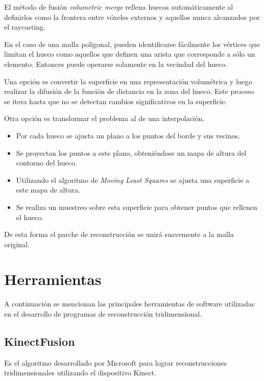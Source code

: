 		El método de fusión \emph{volumetric merge} rellena huecos
		automáticamente al definirlos como la frontera entre vóxeles externos y
		aquellos nunca alcanzados por el raycasting.

		En el caso de una malla poligonal,
		pueden identificarse fácilmente los vértices que limitan el hueco
		como aquellos que definen una arista que corresponde a sólo un elemento.
		Entonces puede operarse solamente en la vecindad del hueco.

		Una opción es convertir la superficie en una
		representación volumétrica y luego realizar la difusión de la función
		de distancia en la zona del hueco.
		Este proceso se itera hasta que no se detectan cambios significativos en la superficie.\cite{fillingholes}

		Otra opción es transformar el problema al de una interpolación.
		\begin{itemize}
			\item Por cada hueco se ajusta un plano a los puntos del borde y
				sus vecinos.
			\item Se proyectan los puntos a este plano, obteniéndose un mapa de
				altura del contorno del hueco.
			\item Utilizando el algoritmo de \emph{Moving Least Squares} se
				ajusta una superficie a este mapa de altura.
			\item Se realiza un muestreo sobre esta superficie para obtener
				puntos que rellenen el hueco.
		\end{itemize}
		De esta forma el parche de reconstrucción se unirá suavemente a la malla original.\cite{Filling_holes_on_locally_smooth_surfaces}





	\section{Herramientas}
	A continuación se mencionan las principales herramientas de software
	utilizadas en el desarrollo de programas de reconstrucción tridimensional.

		\subsection{KinectFusion}
			Es el algoritmo desarrollado por Microsoft para lograr reconstrucciones tridimensionales utilizando el dispositivo Kinect.

